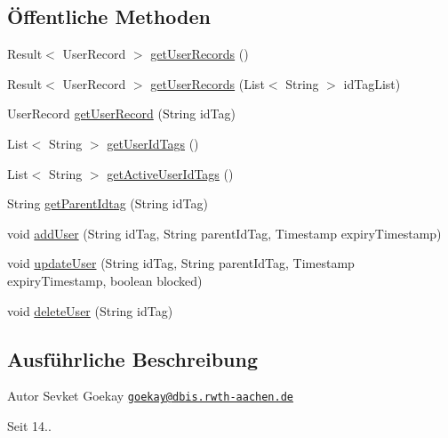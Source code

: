 \subsection*{Öffentliche Methoden}
\begin{DoxyCompactItemize}
\item 
Result$<$ User\-Record $>$ \hyperlink{classde_1_1rwth_1_1idsg_1_1steve_1_1repository_1_1_user_repository_impl_a9ffb4584eb3c0fe0623297915dfaa64f}{get\-User\-Records} ()
\item 
Result$<$ User\-Record $>$ \hyperlink{classde_1_1rwth_1_1idsg_1_1steve_1_1repository_1_1_user_repository_impl_a4668bbc0ce5876b146f2fdfc14205d25}{get\-User\-Records} (List$<$ String $>$ id\-Tag\-List)
\item 
User\-Record \hyperlink{classde_1_1rwth_1_1idsg_1_1steve_1_1repository_1_1_user_repository_impl_aa40e76476db8b34324da405a8deb1446}{get\-User\-Record} (String id\-Tag)
\item 
List$<$ String $>$ \hyperlink{classde_1_1rwth_1_1idsg_1_1steve_1_1repository_1_1_user_repository_impl_af0b99a96857ddbd673d2839538debaa5}{get\-User\-Id\-Tags} ()
\item 
List$<$ String $>$ \hyperlink{classde_1_1rwth_1_1idsg_1_1steve_1_1repository_1_1_user_repository_impl_a366e6269bc7358da823da410a3f1717a}{get\-Active\-User\-Id\-Tags} ()
\item 
String \hyperlink{classde_1_1rwth_1_1idsg_1_1steve_1_1repository_1_1_user_repository_impl_a381f560eed748dbce0d015f01f0bb683}{get\-Parent\-Idtag} (String id\-Tag)
\item 
void \hyperlink{classde_1_1rwth_1_1idsg_1_1steve_1_1repository_1_1_user_repository_impl_a4614a7d7f48414a1125bfc700b331a8a}{add\-User} (String id\-Tag, String parent\-Id\-Tag, Timestamp expiry\-Timestamp)
\item 
void \hyperlink{classde_1_1rwth_1_1idsg_1_1steve_1_1repository_1_1_user_repository_impl_a047d9f7b2cf6ca1a34cf58004f20fb9a}{update\-User} (String id\-Tag, String parent\-Id\-Tag, Timestamp expiry\-Timestamp, boolean blocked)
\item 
void \hyperlink{classde_1_1rwth_1_1idsg_1_1steve_1_1repository_1_1_user_repository_impl_a9b0b0fbd8d0ee4af8fcc830c2da80b28}{delete\-User} (String id\-Tag)
\end{DoxyCompactItemize}


\subsection{Ausführliche Beschreibung}
\begin{DoxyAuthor}{Autor}
Sevket Goekay \href{mailto:goekay@dbis.rwth-aachen.de}{\tt goekay@dbis.\-rwth-\/aachen.\-de} 
\end{DoxyAuthor}
\begin{DoxySince}{Seit}
14.. 
\end{DoxySince}


